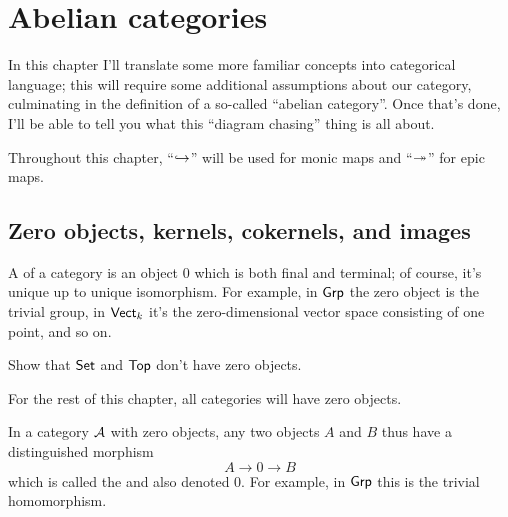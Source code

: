 \chapter{Abelian categories}
In this chapter I'll translate some more familiar concepts into categorical language;
this will require some additional assumptions about our category,
culminating in the definition of a so-called ``abelian category''.
Once that's done, I'll be able to tell you what this ``diagram chasing'' thing is all about.

Throughout this chapter, ``$\injto$'' will be used for monic maps and ``$\surjto$'' for epic maps.

\section{Zero objects, kernels, cokernels, and images}

A  of a category is an object $0$ which is both final and terminal;
of course, it's unique up to unique isomorphism.
For example, in $\catname{Grp}$ the zero object is the trivial group, 
in $\catname{Vect}_k$ it's the zero-dimensional vector space consisting of one point, and so on.
\begin{ques}
	Show that $\catname{Set}$ and $\catname{Top}$ don't have zero objects.
\end{ques}
For the rest of this chapter, all categories will have zero objects.

In a category $\AA$ with zero objects, any two objects $A$ and $B$ thus have a distinguished morphism
\[ A \to 0 \to B \]
which is called the  and also denoted $0$.
For example, in $\catname{Grp}$ this is the trivial homomorphism.

